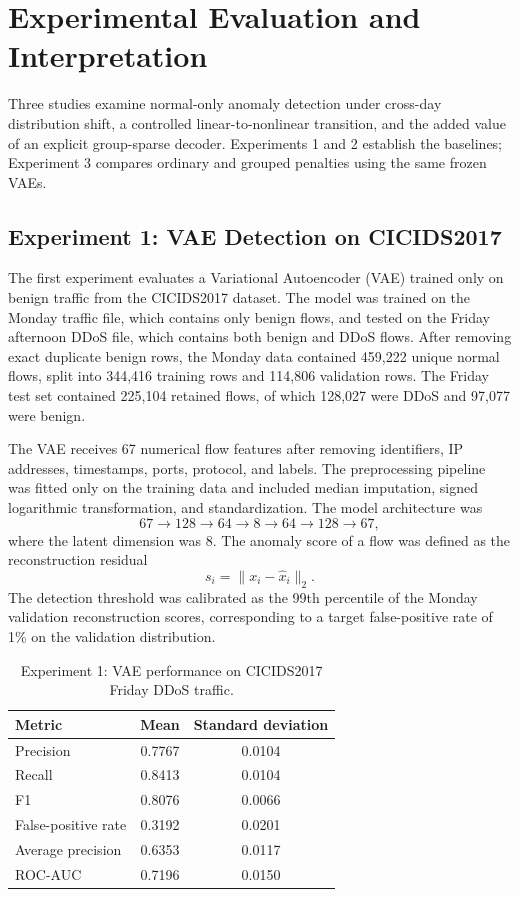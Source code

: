 \documentclass[12pt]{article}
\begin{document}
\section{Experimental Evaluation and Interpretation}

Three studies examine normal-only anomaly detection under cross-day distribution
shift, a controlled linear-to-nonlinear transition, and the added value of an
explicit group-sparse decoder. Experiments 1 and 2 establish the baselines;
Experiment 3 compares ordinary and grouped penalties using the same frozen VAEs.

\subsection{Experiment 1: VAE Detection on CICIDS2017}

The first experiment evaluates a Variational Autoencoder (VAE) trained only on benign traffic from the CICIDS2017 dataset. The model was trained on the Monday traffic file, which contains only benign flows, and tested on the Friday afternoon DDoS file, which contains both benign and DDoS flows. After removing exact duplicate benign rows, the Monday data contained 459,222 unique normal flows, split into 344,416 training rows and 114,806 validation rows. The Friday test set contained 225,104 retained flows, of which 128,027 were DDoS and 97,077 were benign.

The VAE receives 67 numerical flow features after removing identifiers, IP addresses, timestamps, ports, protocol, and labels. The preprocessing pipeline was fitted only on the training data and included median imputation, signed logarithmic transformation, and standardization. The model architecture was
\[
67 \rightarrow 128 \rightarrow 64 \rightarrow 8 \rightarrow 64 \rightarrow 128 \rightarrow 67,
\]
where the latent dimension was 8. The anomaly score of a flow was defined as the reconstruction residual
\[
s_i = \|x_i - \hat{x}_i\|_2.
\]
The detection threshold was calibrated as the 99th percentile of the Monday validation reconstruction scores, corresponding to a target false-positive rate of 1\% on the validation distribution.

\begin{table}[H]
\centering
\caption{Experiment 1: VAE performance on CICIDS2017 Friday DDoS traffic.}
\begin{tabular}{lcc}
\toprule
Metric & Mean & Standard deviation \\
\midrule
Precision & 0.7767 & 0.0104 \\
Recall & 0.8413 & 0.0104 \\
F1 & 0.8076 & 0.0066 \\
False-positive rate & 0.3192 & 0.0201 \\
Average precision & 0.6353 & 0.0117 \\
ROC-AUC & 0.7196 & 0.0150 \\
\bottomrule
\end{tabular}
\end{table}
\end{document}
